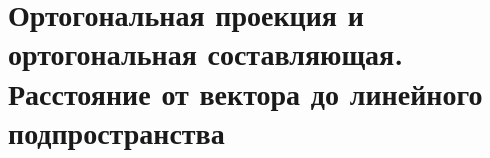 \section{Ортогональная проекция и ортогональная составляющая. Расстояние от вектора до линейного подпространства}

